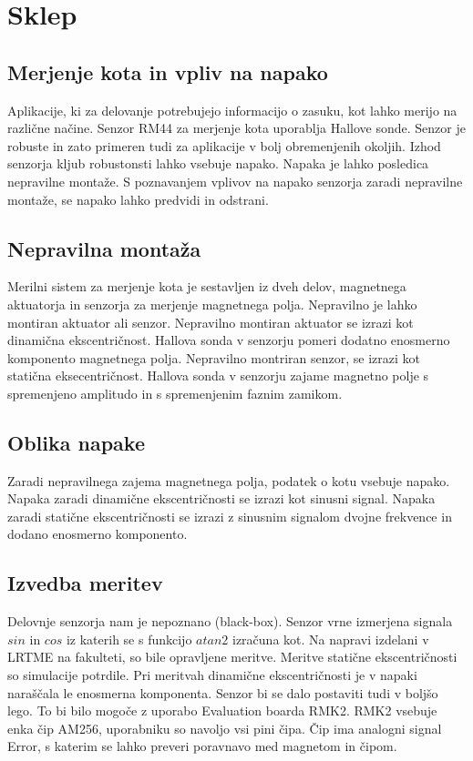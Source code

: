 \chapter{Sklep}
\section{Merjenje kota in vpliv na napako}
Aplikacije, ki za delovanje potrebujejo informacijo o zasuku, kot lahko merijo na različne načine. Senzor RM44 za merjenje kota uporablja Hallove sonde. Senzor je robuste in zato primeren tudi za aplikacije v bolj obremenjenih okoljih. Izhod senzorja kljub robustonsti lahko vsebuje napako. Napaka je lahko posledica nepravilne montaže. S poznavanjem vplivov na napako senzorja zaradi nepravilne montaže, se napako lahko predvidi in odstrani.
\section{Nepravilna montaža}
Merilni sistem za merjenje kota je sestavljen iz dveh delov, magnetnega aktuatorja in senzorja za merjenje magnetnega polja. Nepravilno je lahko montiran aktuator ali senzor. Nepravilno montiran aktuator se izrazi kot dinamična ekscentričnost. Hallova sonda v senzorju pomeri dodatno enosmerno komponento magnetnega polja.
Nepravilno montriran senzor, se izrazi kot statična eksecentričnost. Hallova sonda v senzorju zajame magnetno polje s spremenjeno amplitudo in s spremenjenim faznim zamikom.
\section{Oblika napake}
Zaradi nepravilnega zajema magnetnega polja, podatek o kotu vsebuje napako. Napaka zaradi dinamične ekscentričnosti se izrazi kot sinusni signal. Napaka zaradi statične ekscentričnosti se izrazi z sinusnim signalom dvojne frekvence in dodano enosmerno komponento.
\section{Izvedba meritev}
Delovnje senzorja nam je nepoznano (black-box). Senzor vrne izmerjena signala $sin$ in $cos$ iz katerih se s funkcijo $atan2$ izračuna kot. Na napravi izdelani v LRTME na fakulteti, so bile opravljene meritve. Meritve statične ekscentričnosti so simulacije potrdile. Pri meritvah dinamične ekscentričnosti je v napaki naraščala le enosmerna komponenta. Senzor bi se dalo postaviti tudi v boljšo lego. To bi bilo mogoče z uporabo Evaluation boarda RMK2. RMK2 vsebuje enka čip AM256, uporabniku so navoljo vsi pini čipa. Čip ima analogni signal Error, s katerim se lahko preveri poravnavo med magnetom in čipom.

